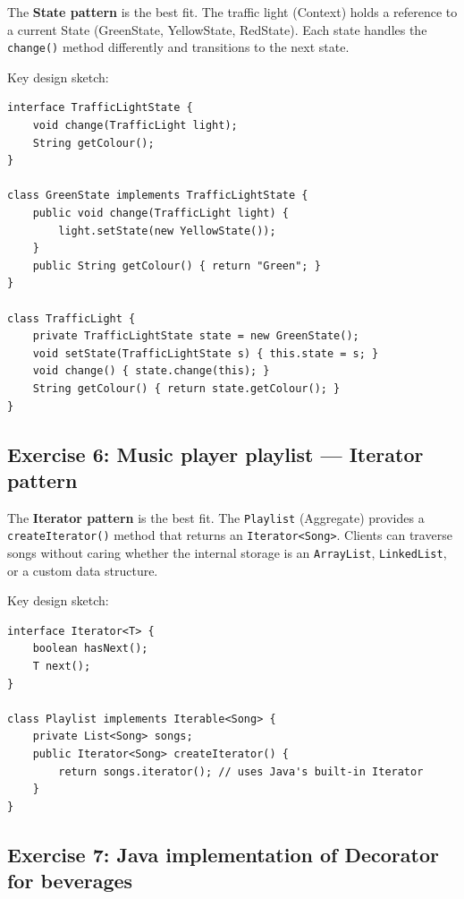 \documentclass[twoside=false,DIV=14]{scrartcl}
\begin{document}
The \textbf{State pattern} is the best fit.  The traffic light (Context) holds a reference to a current State (GreenState, YellowState, RedState).  Each state handles the \texttt{change()} method differently and transitions to the next state.

Key design sketch:
\begin{lstlisting}
interface TrafficLightState {
    void change(TrafficLight light);
    String getColour();
}

class GreenState implements TrafficLightState {
    public void change(TrafficLight light) {
        light.setState(new YellowState());
    }
    public String getColour() { return "Green"; }
}

class TrafficLight {
    private TrafficLightState state = new GreenState();
    void setState(TrafficLightState s) { this.state = s; }
    void change() { state.change(this); }
    String getColour() { return state.getColour(); }
}
\end{lstlisting}

\subsection*{Exercise 6: Music player playlist --- Iterator pattern}

The \textbf{Iterator pattern} is the best fit.  The \texttt{Playlist} (Aggregate) provides a \texttt{createIterator()} method that returns an \texttt{Iterator<Song>}.  Clients can traverse songs without caring whether the internal storage is an \texttt{ArrayList}, \texttt{LinkedList}, or a custom data structure.

Key design sketch:
\begin{lstlisting}
interface Iterator<T> {
    boolean hasNext();
    T next();
}

class Playlist implements Iterable<Song> {
    private List<Song> songs;
    public Iterator<Song> createIterator() {
        return songs.iterator(); // uses Java's built-in Iterator
    }
}
\end{lstlisting}

\subsection*{Exercise 7: Java implementation of Decorator for beverages}
\end{document}
